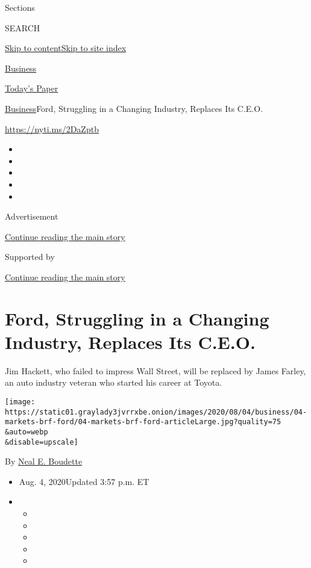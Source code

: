 Sections

SEARCH

\protect\hyperlink{site-content}{Skip to
content}\protect\hyperlink{site-index}{Skip to site index}

\href{https://www.nytimes3xbfgragh.onion/section/business}{Business}

\href{https://myaccount.nytimes3xbfgragh.onion/auth/login?response_type=cookie\&client_id=vi}{}

\href{https://www.nytimes3xbfgragh.onion/section/todayspaper}{Today's
Paper}

\href{/section/business}{Business}\textbar{}Ford, Struggling in a
Changing Industry, Replaces Its C.E.O.

\url{https://nyti.ms/2DaZptb}

\begin{itemize}
\item
\item
\item
\item
\item
\end{itemize}

Advertisement

\protect\hyperlink{after-top}{Continue reading the main story}

Supported by

\protect\hyperlink{after-sponsor}{Continue reading the main story}

\hypertarget{ford-struggling-in-a-changing-industry-replaces-its-ceo}{%
\section{Ford, Struggling in a Changing Industry, Replaces Its
C.E.O.}\label{ford-struggling-in-a-changing-industry-replaces-its-ceo}}

Jim Hackett, who failed to impress Wall Street, will be replaced by
James Farley, an auto industry veteran who started his career at Toyota.

\texttt{[image: https://static01.graylady3jvrrxbe.onion/images/2020/08/04/business/04-markets-brf-ford/04-markets-brf-ford-articleLarge.jpg?quality=75\\\&auto=webp\\\&disable=upscale]}

By \href{https://www.nytimes3xbfgragh.onion/by/neal-e-boudette}{Neal E.
Boudette}

\begin{itemize}
\item
  Aug. 4, 2020Updated 3:57 p.m. ET
\item
  \begin{itemize}
  \item
  \item
  \item
  \item
  \item
  \end{itemize}
\end{itemize}

